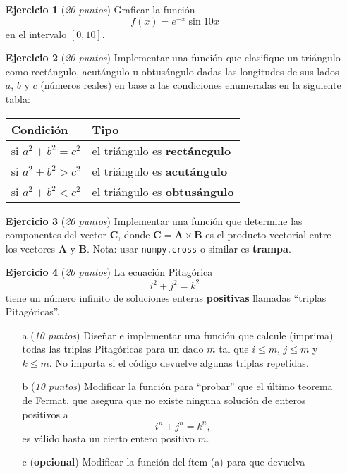 \documentclass[a4paper,12pt]{article}
\begin{document}
\begin{enumerate}
    \item[\bf Ejercicio 1] ({\em 20 puntos}) Graficar la función 
    $$ f(x) = e^{-x}\sin 10x $$
    en el intervalo $[0,10]$.
    \item[\bf Ejercicio 2] ({\em 20 puntos}) Implementar una función que clasifique un triángulo como
    rectángulo, acutángulo u obtusángulo dadas las longitudes de sus lados $a$, $b$ y $c$ (números reales)
    en base a las condiciones enumeradas en la siguiente tabla:
    \begin{center}
        \begin{tabular}{@{}ll@{}}
            Condición            & Tipo                                               \\ \midrule
            si $a^2 + b^2 = c^2$ & el triángulo es {\bf rectáncgulo} \\ 
            si $a^2 + b^2 > c^2$ & el triángulo es {\bf acutángulo}  \\
            si $a^2 + b^2 < c^2$ & el triángulo es {\bf obtusángulo} \\ \bottomrule
            \end{tabular}  
    \end{center}
    \item[\bf Ejercicio 3] ({\em 20 puntos}) Implementar una función que determine las
    componentes del vector $\mathbf{C}$, donde $\mathbf{C}=\mathbf{A}\times\mathbf{B}$
    es el producto vectorial entre los vectores $\mathbf{A}$ y $\mathbf{B}$. 
    Nota: usar {\tt numpy.cross} o similar es {\bf trampa}.
    \item[\bf Ejercicio 4]  ({\em 20 puntos}) La ecuación Pitagórica 
    $$i^2+j^2=k^2$$
    tiene un número infinito de soluciones enteras {\bf positivas} llamadas 
    ``triplas Pitagóricas''. 
    \begin{enumerate}
        \item[a] ({\em 10 puntos}) Diseñar e implementar una función que calcule (imprima) todas las
        triplas Pitagóricas para un dado $m$ tal que $i \le m$, $j\le m$ y $k\le m$.
        No importa si el código devuelve algunas triplas repetidas.
        \item[b] ({\em 10 puntos}) Modificar la función para ``probar'' que el último teorema de Fermat, que
        asegura que no existe ninguna solución de enteros positivos a $$i^n+j^n=k^n,$$
        es válido hasta un cierto entero positivo $m$.
        \item[c] ({\bf opcional}) Modificar la función del ítem (a) para que devuelva

\end{enumerate}
\end{enumerate}
\end{document}
